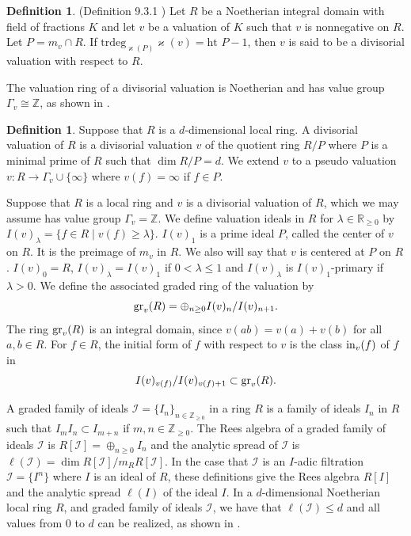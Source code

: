 \documentclass[11pt]{amsart}
\def\NZQ{\mathbb}               %
\def\ZZ{{\NZQ Z}}
\def\RR{{\NZQ R}}
\theoremstyle{definition}
\newtheorem{Definition}[Theorem]{Definition}
\let\kappa=\varkappa
\begin{document}
\begin{Definition}(Definition 9.3.1 \cite{HS}) Let $R$ be a Noetherian integral domain with field of fractions $K$ and let $v$ be a valuation of $K$ such that $v$ is nonnegative on $R$. Let $P=m_v\cap R$. If $\mbox{trdeg}_{\kappa(P)}\kappa(v)=\mbox{ht }P-1$, then $v$ is said to be a divisorial valuation with respect to $R$.
\end{Definition}
The valuation ring of a divisorial valuation is Noetherian and has value group $\Gamma_v\cong \ZZ$, as shown in \cite{HS}. 

\begin{Definition} Suppose that $R$ is a $d$-dimensional  local ring. A divisorial valuation of $R$ is a divisorial valuation $v$ of the quotient ring $R/P$ where $P$ is a minimal prime of $R$ such that $\dim R/P=d$. We extend $v$ to a pseudo valuation  $v:R\rightarrow \Gamma_v\cup\{\infty\}$ where $v(f)=\infty$ if $f\in P$. 
\end{Definition}

Suppose that  $R$ is a  local ring and $v$ is a divisorial valuation of $R$, which we may assume has value group $\Gamma_v=\ZZ$. We define valuation ideals in $R$ for $\lambda\in \RR_{\ge 0}$ by
$I(v)_\lambda=\{f\in R\mid v(f)\ge \lambda\}$. $I(v)_1$ is a prime ideal $P$, called the center of $v$ on $R$. It is the preimage of $m_v$ in $R$. We also will say that $v$ is centered at $P$ on $R$.
$I(v)_0=R$, $I(v)_{\lambda}=I(v)_1$ if $0<\lambda\le 1$ and $I(v)_{\lambda}$ is $I(v)_1$-primary if $\lambda>0$.
We define the associated graded ring of the valuation by 
$$
{\rm gr}_v(R)=\oplus_{n\ge 0}I(v)_n/I(v)_{n+1}.
$$
The ring ${\rm gr}_v(R)$ is an integral domain, since $v(ab)=v(a)+v(b)$ for all $a,b\in R$.
For $f\in R$, the initial form of $f$ with respect to $v$ is the class ${\rm in}_v(f)$ of $f$ in 
$$
I(v)_{v(f)}/I(v)_{v(f)+1}\subset {\rm gr}_v(R).
$$

A graded family of ideals $\mathcal I=\{I_n\}_{n\in \ZZ_{\ge 0}}$ in a ring $R$ is a family of ideals $I_n$ in $R$ such that $I_mI_n\subset I_{m+n}$ if $m,n\in \ZZ_{\ge 0}$. The Rees algebra of a graded family of ideals $\mathcal I$ is $R[\mathcal I]=\oplus_{n\ge 0}I_n$ and the analytic spread of $\mathcal I$ is 
$\ell(\mathcal I)=\dim R[\mathcal I]/m_RR[\mathcal I]$. In the case that $\mathcal I$ is an $I$-adic filtration $\mathcal I=\{I^n\}$ where $I$ is an ideal of $R$, these definitions give the Rees algebra $R[I]$ and the analytic spread $\ell(I)$ of the ideal $I$. In a $d$-dimensional Noetherian local ring $R$, and graded family of ideals $\mathcal I$, we have that 
$\ell(\mathcal I)\le d$ and all values from 0 to $d$ can be realized, as shown in \cite{CPS}.
\end{document}

